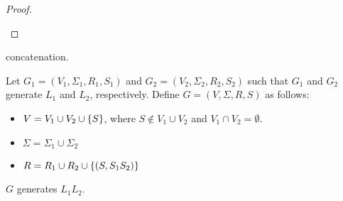 \begin{problem}
\begin{enumalph}
\begin{Answer}
\begin{claim}
\begin{proof}
\begin{enumroman}
          \end{enumroman}
        \end{proof}
      \end{claim}
    \end{Answer}
    \newpage
    \item concatenation.
    \begin{Answer}
      Let $G_1 = (V_1, \Sigma_1, R_1, S_1)$ and $G_2 = (V_2, \Sigma_2, R_2, S_2)$
      such that $G_1$ and $G_2$ generate $L_1$ and $L_2$, respectively.
      Define $G = (V, \Sigma, R, S)$ as follows:
      \begin{itemize}
        \item $V = V_1 \cup V_2 \cup \left\{S\right\}$, where $S \notin V_1 \cup V_2$ and $V_1 \cap V_2 = \emptyset$.
        \item $\Sigma = \Sigma_1 \cup \Sigma_2$
        \item $R = R_1 \cup R_2 \cup \left\{(S, S_1S_2)\right\}$
      \end{itemize}

      \begin{claim}
        $G$ generates $L_1L_2$.


\end{claim}
\end{Answer}
\end{enumalph}
\end{problem}
